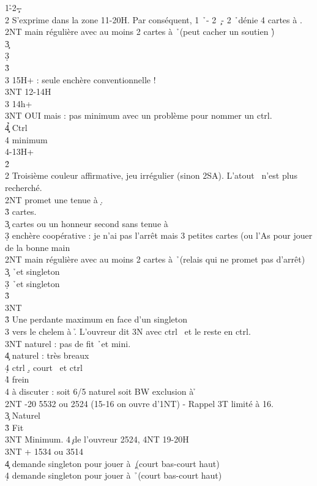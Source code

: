 \documentclass[a4paper]{article}
\begin{document}
\begin{bidtable}
1\h-2\c--\+\\
2\s \> S’exprime dans la zone 11-20H. Par conséquent, 1 \h\ - 2 \c\ - 2 \h\ dénie 4 cartes à \s .\+\\
2NT \> main régulière avec au moins 2 cartes à \h\ (peut cacher un soutien \h )\+\\
3\c {}\\
3\d {}\\
3\h {}\\
3\s {} 15H+ : seule enchère conventionnelle !\\
3NT  12-14H\-\\
3\s \> 14h+\+\\
3NT \> OUI mais : pas minimum avec un problème pour nommer un ctrl.\\
4\c\d\h \> Ctrl\\
4\s \> minimum\-\\
4\s {}-13H+\-\\
2\h\+\\
2\s \> Troisième couleur affirmative, jeu irrégulier (sinon 2SA). L’atout \s\ n’est plus recherché.\+\\
2NT \> promet une tenue à \d .\\
3\h {} cartes.\\
3\c {} cartes ou un honneur second sans tenue à \d \\
3\d \> enchère coopérative : je n’ai pas l’arrêt mais 3 petites cartes (ou l’As pour jouer de la bonne main\-\\
2NT \> main régulière avec au moins 2 cartes à \h\ (relais qui ne promet pas d'arrêt)\+\\
3\c {} \h\ et singleton \c \\
3\d {} \h\ et singleton \d \\
3\h {}\\
3NT \-\\
3\h \> Une perdante maximum en face d'un singleton\+\\
3\s \> vers le chelem à \h . L'ouvreur dit 3N avec ctrl \s\ et le reste en ctrl.\\
3NT \> naturel : pas de fit \h\ et mini.\\
4\c \> naturel : très breaux \c \\
4\d \> ctrl \d , court \s\ et ctrl \c \\
4\h \> frein\\
4\s \> à discuter : soit 6/5 naturel soit BW exclusion à \h \-\-\\
2NT -20 5532 ou 2524 (15-16 on ouvre d'1NT) - Rappel 3T limité à 16.\+\\
3\c \> Naturel\\
3\h \> Fit \h \\
3NT \> Minimum. 4\c\ de l'ouvreur 2524, 4NT 19-20H\-\\
3NT + 1534 ou 3514\+\\
4\c \> demande singleton pour jouer à \c\ (court bas-court haut)\\
4\d \> demande singleton pour jouer à \h\ (court bas-court haut)\-\-
\end{bidtable}
\end{document}
